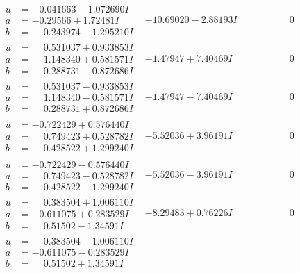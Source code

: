 \documentclass[1p]{elsarticle_modified}
\theoremstyle{definition}
\begin{document}
$$\begin{array}{c|c|c}
\begin{aligned}
u &= -0.041663 - 1.072690 I \\
a &= -0.29566 + 1.72481 I \\
b &= \phantom{-}0.243974 - 1.295210 I\end{aligned}
 & -10.69020 - 2.88193 I & \phantom{-0.000000 } 0 \\ \hline\begin{aligned}
u &= \phantom{-}0.531037 + 0.933853 I \\
a &= \phantom{-}1.148340 + 0.581571 I \\
b &= \phantom{-}0.288731 - 0.872686 I\end{aligned}
 & -1.47947 + 7.40469 I & \phantom{-0.000000 } 0 \\ \hline\begin{aligned}
u &= \phantom{-}0.531037 - 0.933853 I \\
a &= \phantom{-}1.148340 - 0.581571 I \\
b &= \phantom{-}0.288731 + 0.872686 I\end{aligned}
 & -1.47947 - 7.40469 I & \phantom{-0.000000 } 0 \\ \hline\begin{aligned}
u &= -0.722429 + 0.576440 I \\
a &= \phantom{-}0.749423 + 0.528782 I \\
b &= \phantom{-}0.428522 + 1.299240 I\end{aligned}
 & -5.52036 + 3.96191 I & \phantom{-0.000000 } 0 \\ \hline\begin{aligned}
u &= -0.722429 - 0.576440 I \\
a &= \phantom{-}0.749423 - 0.528782 I \\
b &= \phantom{-}0.428522 - 1.299240 I\end{aligned}
 & -5.52036 - 3.96191 I & \phantom{-0.000000 } 0 \\ \hline\begin{aligned}
u &= \phantom{-}0.383504 + 1.006110 I \\
a &= -0.611075 + 0.283529 I \\
b &= \phantom{-}0.51502 - 1.34591 I\end{aligned}
 & -8.29483 + 0.76226 I & \phantom{-0.000000 } 0 \\ \hline\begin{aligned}
u &= \phantom{-}0.383504 - 1.006110 I \\
a &= -0.611075 - 0.283529 I \\
b &= \phantom{-}0.51502 + 1.34591 I\end{aligned}

\end{array}$$
\end{document}
